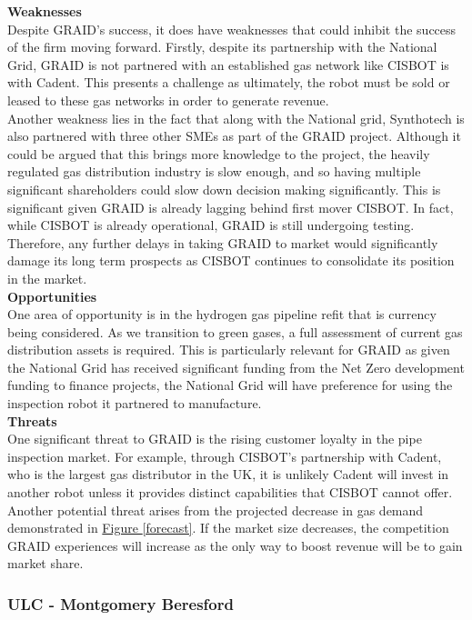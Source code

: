 \documentclass[11pt]{article}		%
\newcommand{\figref}[1]{\hyperref[#1]{Figure \ref*{#1}}}    %
\begin{document}
	        \textbf{Weaknesses}\\
	        Despite GRAID’s success, it does have weaknesses that could inhibit the success of the firm moving forward. Firstly, despite its partnership with the National Grid, GRAID is not partnered with an established gas network like CISBOT is with Cadent. This presents a challenge as ultimately, the robot must be sold or leased to these gas networks in order to generate revenue. \\
	        \hspace*{3ex}Another weakness lies in the fact that along with the National grid, Synthotech is also partnered with three other SMEs as part of the GRAID project. Although it could be argued that this brings more knowledge to the project, the heavily regulated gas distribution industry is slow enough, and so having multiple significant shareholders could slow down decision making significantly. This is significant given GRAID is already lagging behind first mover CISBOT. In fact, while CISBOT is already operational, GRAID is still undergoing testing. Therefore, any further delays in taking GRAID to market would significantly damage its long term prospects as CISBOT continues to consolidate its position in the market. \\
	        \textbf{Opportunities}\\
	        One area of opportunity is in the hydrogen gas pipeline refit that is currency being considered. As we transition to green gases, a full assessment of current gas distribution assets is required. This is particularly relevant for GRAID as given the National Grid has received significant funding from the Net Zero development funding to finance projects, the National Grid will have preference for using the inspection robot it partnered to manufacture. \\
	        \textbf{Threats} \\
	        One significant threat to GRAID is the rising customer loyalty in the pipe inspection market. For example, through CISBOT's partnership with Cadent, who is the largest gas distributor in the UK, it is unlikely Cadent will invest in another robot unless it provides distinct capabilities that CISBOT cannot offer. Another potential threat arises from the projected decrease in gas demand demonstrated in \figref{forecast}. If the market size decreases, the competition GRAID experiences will increase as the only way to boost revenue will be to gain market share.
	        
     	\subsubsection[ULC]{ULC - Montgomery Beresford }
	        
\end{document}
